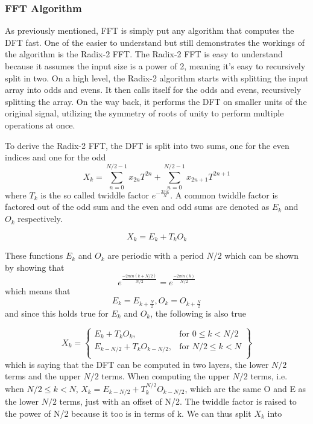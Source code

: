 


\subsubsection{FFT Algorithm}
As previously mentioned, FFT is simply put any algorithm that computes the DFT fast. One of the easier to understand but still demonstrates the workings of the algorithm is the Radix-2 FFT. The Radix-2 FFT is easy to understand because it assumes the input size is a power of 2, meaning it's easy to recursively split in two. On a high level, the Radix-2 algorithm starts with splitting the input array into odds and evens. It then calls itself for the odds and evens, recursively splitting the array. On the way back, it performs the DFT on smaller units of the original signal, utilizing the symmetry of roots of unity to perform multiple operations at once. 

To derive the Radix-2 FFT, the DFT is split into two sums, one for the even indices and one for the odd 
$$X_k = \sum^{N/2-1}_{n=0} x_{2n}T^{2n}+ \sum^{N/2-1}_{n=0} x_{2n+1}T^{2n+1}$$
where $T_k$ is the so called twiddle factor $e^{-\frac{2\pi ik}{N}}$. A common twiddle factor is factored out of the odd sum and the even and odd sums are denoted as $E_k$ and $O_k$ respectively. 

$$X_k = E_k + T_kO_k$$

These functions $E_k$ and $O_k$ are periodic with a period $N/2$ which can be shown by showing that $$e^{\frac{-2\pi in(k+N/2)}{N/2}} = e^{\frac{-2\pi in(k)}{N/2}}$$
which means that 
$$E_k = E_{k+\frac{N}{2}}, O_k = O_{k+\frac{N}{2}}$$
and since this holds true for $E_k$ and $O_k$, the following is also true

\[
X_k = \left\{\begin{array}{lr}
    E_k + T_kO_k, & \text{for } 0 \leq k < N/2\\
    E_{k-N/2} + T_kO_{k-N/2}, & \text{for } N/2\leq k< N\\
    \end{array}\right\}
\]
which is saying that the DFT can be computed in two layers, the lower $N/2$ terms and the upper $N/2$ terms.
When computing the upper $N/2$ terms, i.e. when $N/2 \leq k < N$, $X_k = E_{k-N/2} + T_k^{N/2}O_{k-N/2}$, which are the same O and E as the lower $N/2$ terms, just with an offset of N/2. The twiddle factor is raised to the power of N/2 because it too is in terms of k. We can thus split $X_k$ into 

